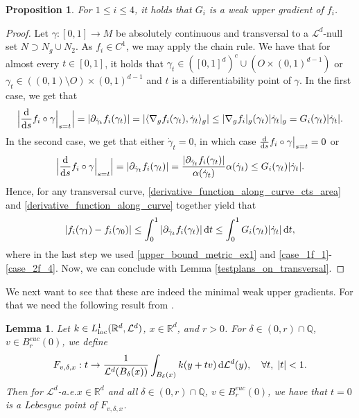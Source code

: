 \documentclass[a4paper,10pt]{article}
\newtheorem{proposition}[theorem]{Proposition}
\newtheorem{lemma}[theorem]{Lemma}
\numberwithin{equation}{section}
\newcommand{\R}{\mathbb{R}}
\newcommand{\Q}{\mathbb{Q}}
\newcommand{\di}{{\rm d}}
\begin{document}
\begin{proposition}\label{weak_upper_gradient_ex1}
    For $1 \leq i \leq4$, it holds that $G_i$ is a weak upper gradient of $f_i$.
\end{proposition}
\begin{proof}
    Let $\gamma:[0,1] \to M$ be absolutely continuous and transversal to a $\mathcal{L}^d$-null set $N \supset N_g \cup N_2$. As $f_i \in C^1$, we may apply the chain rule. We have that for almost every $t \in [0,1]$, it holds that $\gamma_t \in ([0,1]^d)^c \cup (O \times (0,1)^{d-1})$ or $\gamma_t \in ((0,1)\setminus O) \times (0,1)^{d-1}$ and $t$ is a differentiability point of $\gamma$.
    In the first case, we get that 
\begin{align}\label{derivative_function_along_curve_cts_area}
    \Big|\frac{\di}{\di s} f_i\circ \gamma \Big|_{s=t} \Big|= |\partial_{\dot{\gamma}_t}f_i(\gamma_t)| = |\langle \nabla_gf_i(\gamma_t), \dot{\gamma}_t\rangle_g| \leq |\nabla_g f_i|_g(\gamma_t) |\dot{\gamma}_t|_g = G_i(\gamma_t) |\dot{\gamma}_t|.
\end{align}  
In the second case, we get that either $\dot{\gamma}_t=0$, in which case $\frac{\di}{\di s} f_i\circ \gamma \big|_{s=t}=0$ or
\begin{align}\label{derivative_function_along_curve}
    \Big|\frac{\di}{\di s} f_i\circ \gamma \Big|_{s=t} \Big|= |\partial_{\dot{\gamma}_t}f_i(\gamma_t)| = \frac{|\partial_{\dot{\gamma}_t}f_i(\gamma_t)|}{\alpha(\dot{\gamma}_t)}\alpha(\dot{\gamma}_t)\leq G_i(\gamma_t)|\dot{\gamma}_t|.
\end{align}
Hence, for any transversal curve, \eqref{derivative_function_along_curve_cts_area} and \eqref{derivative_function_along_curve} together yield that  
\begin{align}
    |f_i(\gamma_1)-f_i(\gamma_0)|\leq \int_0^1 |\partial_{\dot{\gamma}_t}f_i(\gamma_t)|\,\di t  \leq \int_0^1 G_i(\gamma_t)|\dot{\gamma}_t|\, \di t,
\end{align}
where in the last step we used \eqref{upper_bound_metric_ex1} and \eqref{case_1f_1}-\eqref{case_2f_4}.
Now, we can conclude with Lemma \ref{testplans_on_transversal}.
\end{proof}
We next want to see that these are indeed the minimal weak upper gradients. For that we need the following result from \cite[Lemma 4.23]{mondino2025equivalence}. 
\smallskip

\begin{lemma}\label{Lebesguepointsadvanced_c} 
Let $k \in L^1_{\rm{loc}}(\R^d, \mathcal{L}^d)$, $x \in \R^d$, and $r > 0$.
For $\delta \in (0, r)\cap \Q$, $v \in B_r^{euc}(0)$,  we define 
    \begin{align*}
        F_{v, \delta, x}: t \to \frac{1}{\mathcal{L}^d(B_\delta(x))}\int_{B_\delta(x)} k(y + tv)\,\di\mathcal{L}^d(y), \quad \forall t, \;|t|< 1.
    \end{align*}
    Then for $\mathcal{L}^d$-a.e.\;$x \in \R^d$ and all {$\delta \in (0, r)\cap \Q$}, $v \in B_r^{euc}(0)$, we have that $t=0$ is a Lebesgue point of $ F_{v, \delta, x}$.
\end{lemma}
\end{document}
